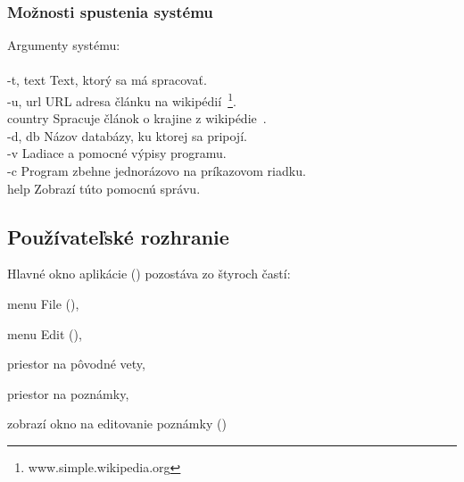 \subsubsection{Možnosti spustenia systému}
Argumenty systému: \\
\\
\hspace*{1cm} -t, \hyph\hyph text\hspace*{1cm} Text, ktorý sa má spracovať. \\
\hspace*{1cm} -u, \hyph\hyph url\hspace*{1.07cm} URL adresa článku na wikipédií~\footnote{\label{footnote:simple_wiki}www.simple.wikipedia.org}. \\
\hspace*{1cm} \hyph\hyph country\hspace*{0.84cm} Spracuje článok o krajine z wikipédie~. \\
\hspace*{1cm} -d, \hyph\hyph db\hspace*{1.16cm} Názov databázy, ku ktorej sa pripojí. \\
\hspace*{1cm} -v\hspace*{2.08cm} Ladiace a pomocné výpisy programu. \\
\hspace*{1cm} -c\hspace*{2.08cm} Program zbehne jednorázovo na príkazovom riadku. \\
\hspace*{1cm} \hyph\hyph help\hspace*{1.42cm} Zobrazí túto pomocnú správu.
\subsection{Používateľské rozhranie}

Hlavné okno aplikácie () pozostáva zo štyroch častí:
\begin{my_enumerate}
	\item menu File (),
	\item menu Edit (),
	\item priestor na pôvodné vety,
	\item priestor na poznámky,
	\item zobrazí okno na editovanie poznámky ()
\end{my_enumerate}

